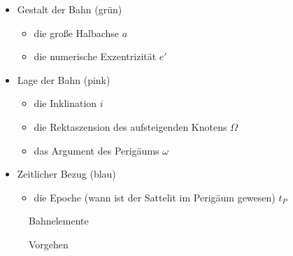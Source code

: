 \begin{itemize}
	\item Gestalt der Bahn (grün)
	\begin{itemize}
		\item die große Halbachse \ensuremath{a}
		\item die numerische Exzentrizität \ensuremath{e'}
	\end{itemize}
	\item Lage der Bahn (pink)
	\begin{itemize}
		\item die Inklination \ensuremath{i}
		\item die Rektaszension des aufsteigenden Knotens \ensuremath{\Omega}
		\item das Argument des Perigäums \ensuremath{\omega}
	\end{itemize}
	\item Zeitlicher Bezug (blau)
	\begin{itemize}
		\item die Epoche (wann ist der Sattelit im Perigäum gewesen) \ensuremath{t_P}
	\end{itemize}
\end{itemize} 
\begin{figure}[h]
	\centering
	\caption[Bahnelemente]{Bahnelemente}              
	\label{fig:bahnelemente_ueb_ii} 
\end{figure}
\begin{figure}[h]
	\centering
	\caption[Vorgehen]{Vorgehen}              
	\label{fig:bahnelemente_ueb_i} 
\end{figure}
